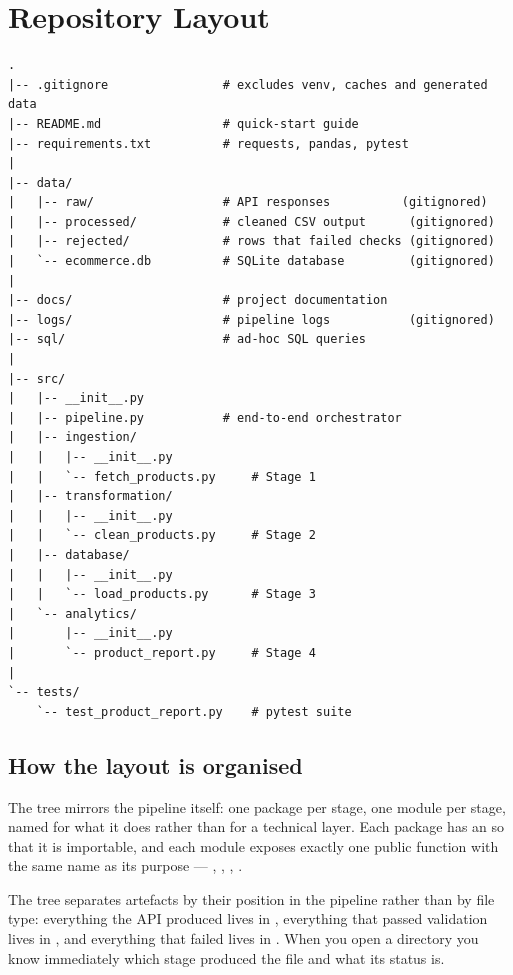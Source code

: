 \section{Repository Layout}

\begin{codebox}
\noindent
\begin{lstlisting}[style=txt]
.
|-- .gitignore                # excludes venv, caches and generated data
|-- README.md                 # quick-start guide
|-- requirements.txt          # requests, pandas, pytest
|
|-- data/
|   |-- raw/                  # API responses          (gitignored)
|   |-- processed/            # cleaned CSV output      (gitignored)
|   |-- rejected/             # rows that failed checks (gitignored)
|   `-- ecommerce.db          # SQLite database         (gitignored)
|
|-- docs/                     # project documentation
|-- logs/                     # pipeline logs           (gitignored)
|-- sql/                      # ad-hoc SQL queries
|
|-- src/
|   |-- __init__.py
|   |-- pipeline.py           # end-to-end orchestrator
|   |-- ingestion/
|   |   |-- __init__.py
|   |   `-- fetch_products.py     # Stage 1
|   |-- transformation/
|   |   |-- __init__.py
|   |   `-- clean_products.py     # Stage 2
|   |-- database/
|   |   |-- __init__.py
|   |   `-- load_products.py      # Stage 3
|   `-- analytics/
|       |-- __init__.py
|       `-- product_report.py     # Stage 4
|
`-- tests/
    `-- test_product_report.py    # pytest suite
\end{lstlisting}
\end{codebox}

\subsection{How the layout is organised}

The  tree mirrors the pipeline itself: one package per stage, one
module per stage, named for what it does rather than for a technical layer.
Each package has an  so that it is importable, and
each module exposes exactly one public function with the same name as its
purpose --- , ,
, .

The  tree separates artefacts by their position in the pipeline
rather than by file type: everything the API produced lives in ,
everything that passed validation lives in , and everything
that failed lives in . When you open a directory you know
immediately which stage produced the file and what its status is.

